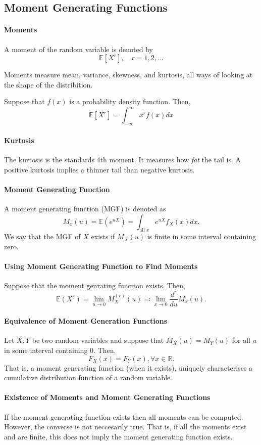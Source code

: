 \subsection{Moment Generating Functions}

\paragraph{Moments}
A moment of the random variable is denoted by
\[ 
    \mathbb{E}[X^r], \quad r = 1, 2, \dots
\]

Moments measure mean, variance, skewness, and kurtosis, all ways of
looking at the shape of the distribition.

Suppose that \(f(x)\) is a probability density function. Then,
\[
    \mathbb{E}[X^r] = \int_{-\infty}^{\infty} x^r f(x)dx
\]


\paragraph{Kurtosis}
The kurtosis is the standards 4th moment. It measures how \textit{fat}
the tail is. A positive kurtosis implies a thinner tail than negative
kurtosis.

\paragraph{Moment Generating Function}
A moment generating function (MGF) is denoted as
\[
    M_x(u) = \mathbb{E}(e^{uX})
    = \int_{\text{all } x} e^{uX} f_X(x)dx.
\]
We say that the MGF of \(X\) exists if \(M_X(u)\) is finite
in some interval containing zero.

\paragraph{Using Moment Generating Function to Find Moments}
Suppose that the moment genrating funciton exists. Then,
\[
    \mathbb{E}(X^r)
    = \lim_{u\to 0} M_X^(r)(u)
    \eqqcolon \lim_{x\to 0} \frac{d^r}{d u} M_x(u) .
\]

\paragraph{Equivalence of Moment Generation Functions}
Let \(X, Y\) be two random variables and 
suppose that \(M_X(u) = M_Y(u)\) for all \(u\) in some interval
containing \(0\). Then, \[
    F_X(x) = F_Y(x), \forall x \in \mathbb{R}.
\]
That is, a moment generating function (when it exists), uniquely
characterises a cumulative distribution function of a random variable.

\paragraph{Existence of Moments and Moment Generating Functions}
If the moment generating function exists then all moments can be computed.
However, the converse is not neccesarily true.
That is, if all the moments exist and are finite, this does not imply
the moment generating function exists.


